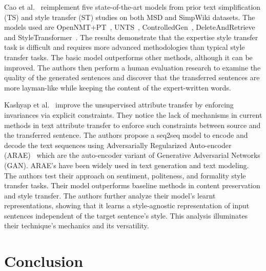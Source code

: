 \documentclass[akbc,twoside,11pt]{article}
\begin{document}
Cao et al.~\cite{cao2020expertise} reimplement five state-of-the-art models from prior text simplification (TS) and style transfer (ST) studies on both MSD and SimpWiki datasets. The models used are OpenNMT+PT~\cite{klein-etal-2017-opennmt}, UNTS~\cite{sheang-saggion-2021-controllable}, ControlledGen~\cite{hu2018controlled}, DeleteAndRetrieve~\cite{li-etal-2018-delete} and StyleTransformer~\cite{dai-etal-2019-style}. The results demonstrate that the expertise style transfer task is difficult and requires more advanced methodologies than typical style transfer tasks. The basic model outperforms other methods, although it can be improved. The authors then perform a human evaluation research to examine the quality of the generated sentences and discover that the transferred sentences are more layman-like while keeping the content of the expert-written words.


Kashyap et al.~\cite{kashyap2022different} improve the unsupervised attribute transfer by enforcing invariances via explicit constraints. They notice the lack of mechanisms in current methods in text attribute transfer to enforce such constraints between source and the transferred sentence. The authors propose a seq2seq model to encode and decode the text sequences using Adversarially Regularized Auto-encoder (ARAE)~\cite{zhao2018adversarially} which are the auto-encoder variant of Generative Adversarial Networks (GAN). ARAE's have been widely used in text generation and text modeling. The authors test their approach on sentiment, politeness, and formality style transfer tasks. Their model outperforms baseline methods in content preservation and style transfer. The authors further analyze their model's learnt representations, showing that it learns a style-agnostic representation of input sentences independent of the target sentence's style. This analysis illuminates their technique's mechanics and its versatility.

\section{Conclusion}
\end{document}
